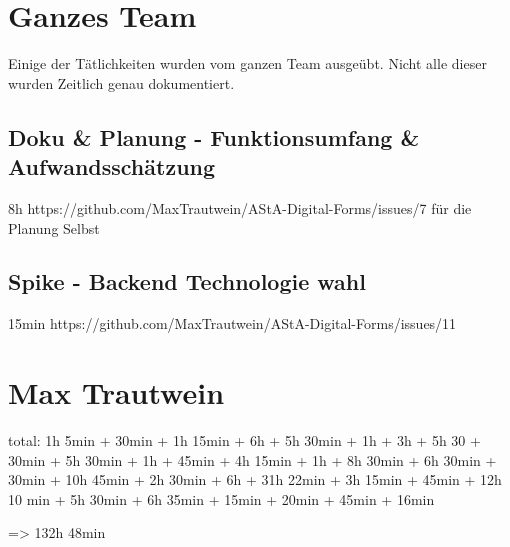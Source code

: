 \section{Ganzes Team}
Einige der Tätlichkeiten wurden vom ganzen Team ausgeübt.
Nicht alle dieser wurden Zeitlich genau dokumentiert.

\subsection{Doku & Planung - Funktionsumfang & Aufwandsschätzung}
8h
https://github.com/MaxTrautwein/AStA-Digital-Forms/issues/7
für die Planung Selbst

\subsection{Spike - Backend Technologie wahl }
15min
https://github.com/MaxTrautwein/AStA-Digital-Forms/issues/11

\section{Max Trautwein}\label{sec:max-trautwein}

total: 1h 5min + 30min + 1h 15min + 6h + 5h 30min + 1h + 3h + 5h 30 + 30min + 5h 30min + 1h + 45min + 4h 15min + 1h
+ 8h 30min + 6h 30min + 30min + 10h 45min + 2h 30min + 6h + 31h 22min + 3h 15min + 45min + 12h 10 min + 5h 30min + 6h 35min
+ 15min + 20min + 45min + 16min

=> 132h 48min

